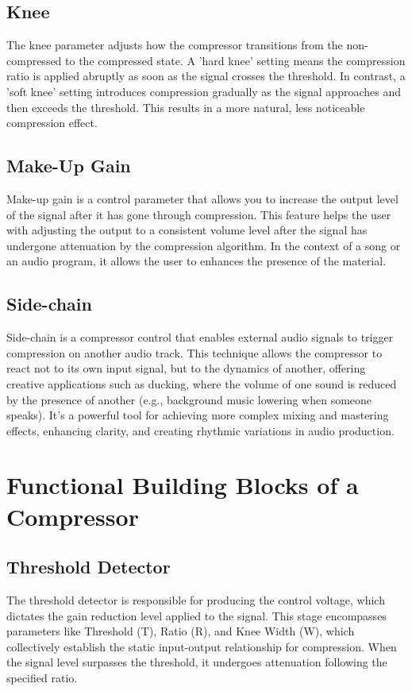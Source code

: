 \documentclass[10pt]{article}
\begin{document}
\begin{multicols*}{2}
            \subsection{Knee}
                The knee parameter adjusts how the compressor transitions from the non-compressed to the compressed state. A 'hard knee' setting means the compression ratio is applied abruptly as soon as the signal crosses the threshold. In contrast, a 'soft knee' setting introduces compression gradually as the signal approaches and then exceeds the threshold. This results in a more natural, less noticeable compression effect.
            
            \subsection{Make-Up Gain}
                Make-up gain is a control parameter that allows you to increase the output level of the signal after it has gone through compression. This feature helps the user with adjusting the output to a consistent volume level after the signal has undergone attenuation by the compression algorithm. In the context of a song or an audio program, it allows the user to enhances the presence of the material.

            \subsection{Side-chain}
                Side-chain is a compressor control that enables external audio signals to trigger compression on another audio track. This technique allows the compressor to react not to its own input signal, but to the dynamics of another, offering creative applications such as ducking, where the volume of one sound is reduced by the presence of another (e.g., background music lowering when someone speaks). It's a powerful tool for achieving more complex mixing and mastering effects, enhancing clarity, and creating rhythmic variations in audio production.

        \section{Functional Building Blocks of a Compressor}

            \subsection{Threshold Detector}
                The threshold detector is responsible for producing the control voltage, which dictates the gain reduction level applied to the signal. This stage encompasses parameters like Threshold (T), Ratio (R), and Knee Width (W), which collectively establish the static input-output relationship for compression. When the signal level surpasses the threshold, it undergoes attenuation following the specified ratio.
            

\end{multicols*}
\end{document}
